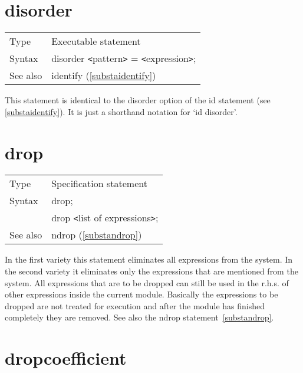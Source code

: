 
\section{disorder}
\label{substadisorder}

\noindent \begin{tabular}{ll}
Type & Executable statement \\
Syntax & disorder {\tt<}pattern{\tt>} = {\tt<}expression{\tt>};
\\ See also & identify (\ref{substaidentify})
\end{tabular} \vspace{4mm}

\noindent This statement is identical to the disorder 
option of the id 
statement (see \ref{substaidentify}). It is just a shorthand notation for 
`id disorder'. \vspace{10mm}


\section{drop}
\label{substadrop}

\noindent \begin{tabular}{ll}
Type & Specification statement\\
Syntax & drop; \\
       & drop {\tt<}list of expressions{\tt>};
\\ See also & ndrop (\ref{substandrop})
\end{tabular} \vspace{4mm}

\noindent In the first variety this statement eliminates all 
expressions from the system. In the second variety it 
eliminates only the expressions that are mentioned from the system. All 
expressions that are to be dropped can still be used in the r.h.s. of other 
expressions inside the current module. Basically the expressions to be 
dropped are not treated for execution and after the module has finished 
completely they are removed. See also the ndrop 
statement~\ref{substandrop}. \vspace{10mm}


\section{dropcoefficient}
\label{substadropcoefficient}

